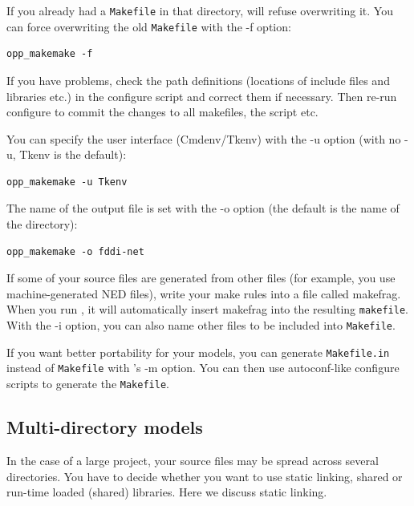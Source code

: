 If you already had a \texttt{Makefile} in that directory, 
will refuse overwriting it. You can force overwriting the old \texttt{Makefile}
with the -f option:

\begin{Verbatim}
opp_makemake -f
\end{Verbatim}

If you have problems, check the path definitions (locations of include
files and libraries etc.) in the configure script and correct them if necessary. Then re-run configure to
commit the changes to all makefiles, the  script
etc.


You can specify the user interface (Cmdenv/Tkenv) with the -u option
(with no -u, Tkenv is the default):

\begin{Verbatim}
opp_makemake -u Tkenv
\end{Verbatim}

The name of the output file is set with the -o
option (the default is the name of the directory):

\begin{Verbatim}
opp_makemake -o fddi-net
\end{Verbatim}

If some of your source files are generated from other files (for
example, you use machine-generated NED files), write your make rules
into a file called makefrag. When you run , it
will automatically insert makefrag into the resulting \texttt{makefile}.  With
the -i option, you can also name other files to be included into
\texttt{Makefile}.


If you want better portability for your models, you can generate
\texttt{Makefile.in} instead of \texttt{Makefile} with 's -m
option. You can then use autoconf-like configure scripts to generate
the \texttt{Makefile}.





\subsection{Multi-directory models}

In the case of a large project, your source files may be spread across
several directories. You have to decide whether you want to use static
linking, shared or run-time loaded (shared)
libraries. Here we discuss static linking.



